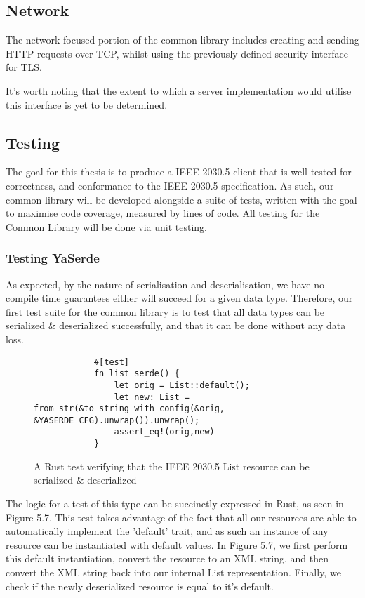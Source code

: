\subsection{Network}
The network-focused portion of the common library includes creating and sending HTTP requests over TCP, whilst using the previously defined security interface for TLS.

It's worth noting that the extent to which a server implementation would utilise this interface is yet to be determined.


\subsection{Testing}
The goal for this thesis is to produce a IEEE 2030.5 client that is well-tested for correctness, and conformance to the IEEE 2030.5 specification.
As such, our common library will be developed alongside a suite of tests, written with the goal to maximise code coverage, measured by lines of code.
All testing for the Common Library will be done via unit testing.

\subsubsection{Testing YaSerde}
As expected, by the nature of serialisation and deserialisation, we have no compile time guarantees either will succeed for a given data type.
Therefore, our first test suite for the common library is to test that all data types can be serialized \& deserialized successfully, and that it can be done without any data loss.

\begin{figure}[h]
    \begin{center}
        \begin{lstlisting}
            #[test]
            fn list_serde() {
                let orig = List::default();
                let new: List = from_str(&to_string_with_config(&orig, &YASERDE_CFG).unwrap()).unwrap();
                assert_eq!(orig,new)
            }
        \end{lstlisting}
        \label{fig:yaserdetest}
        \vspace{-10pt}
        \caption{A Rust test verifying that the IEEE 2030.5 List resource can be serialized \& deserialized}
    \end{center}
\end{figure}

The logic for a test of this type can be succinctly expressed in Rust, as seen in Figure 5.7. 
This test takes advantage of the fact that all our resources are able to automatically implement the 'default' trait, and as such an instance of any resource can be instantiated with default values.
In Figure 5.7, we first perform this default instantiation, convert the resource to an XML string, and then convert the XML string back into our internal List representation. 
Finally, we check if the newly deserialized resource is equal to it's default.


